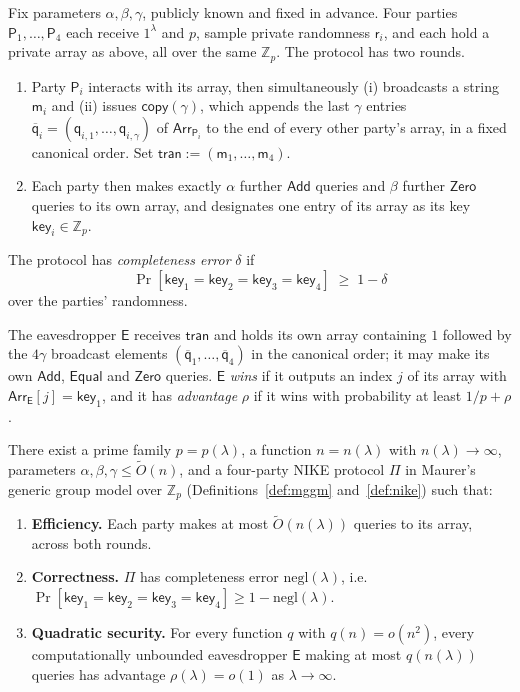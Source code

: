 \documentclass{aicr-conjecture}
\newcommand{\Zp}{\mathbb{Z}_{p}}
\newcommand{\Add}{\mathsf{Add}}
\newcommand{\Zero}{\mathsf{Zero}}
\newcommand{\Equal}{\mathsf{Equal}}
\newcommand{\copyq}{\mathsf{copy}}
\newcommand{\Arr}{\mathsf{Arr}}
\newcommand{\Pty}{\mathsf{P}}
\newcommand{\Ev}{\mathsf{E}}
\newcommand{\tran}{\mathsf{tran}}
\newcommand{\keyv}{\mathsf{key}}
\newcommand{\rv}{\mathsf{r}}
\newcommand{\mv}{\mathsf{m}}
\newcommand{\qv}{\mathsf{q}}
\newcommand{\negl}{\mathrm{negl}}
\begin{document}
\begin{definition}\label{def:nike}
Fix parameters $\alpha, \beta, \gamma$, publicly known and fixed in
advance. Four parties $\Pty_{1},\dots,\Pty_{4}$ each receive $1^{\lambda}$
and $p$, sample private randomness $\rv_{i}$, and each hold a private
array as above, all over the same $\Zp$. The protocol has two rounds.
\begin{enumerate}
  \item Party $\Pty_{i}$ interacts with its array, then simultaneously
    (i) broadcasts a string $\mv_{i}$ and (ii) issues $\copyq(\gamma)$,
    which appends the last $\gamma$ entries
    $\overline{\qv}_{i} = (\qv_{i,1},\dots,\qv_{i,\gamma})$ of
    $\Arr_{\Pty_{i}}$ to the end of every other party's array, in a fixed
    canonical order. Set $\tran := (\mv_{1},\dots,\mv_{4})$.
  \item Each party then makes exactly $\alpha$ further $\Add$ queries and
    $\beta$ further $\Zero$ queries to its own array, and designates one
    entry of its array as its key $\keyv_{i} \in \Zp$.
\end{enumerate}
The protocol has \emph{completeness error} $\delta$ if
\[
  \Pr[\keyv_{1} = \keyv_{2} = \keyv_{3} = \keyv_{4}] \;\ge\; 1 - \delta
\]
over the parties' randomness.

The eavesdropper $\Ev$ receives $\tran$ and holds its own array
containing $1$ followed by the $4\gamma$ broadcast elements
$(\overline{\qv}_{1},\dots,\overline{\qv}_{4})$ in the canonical order;
it may make its own $\Add$, $\Equal$ and $\Zero$ queries. $\Ev$
\emph{wins} if it outputs an index $j$ of its array with
$\Arr_{\Ev}[j] = \keyv_{1}$, and it has \emph{advantage} $\rho$ if it
wins with probability at least $1/p + \rho$.
\end{definition}

\begin{conjecture}\label{conj:main}
There exist a prime family $p = p(\lambda)$, a function $n = n(\lambda)$
with $n(\lambda) \to \infty$, parameters
$\alpha, \beta, \gamma \le \tilde{O}(n)$, and a four-party NIKE protocol
$\Pi$ in Maurer's generic group model over $\Zp$
(Definitions~\ref{def:mggm} and~\ref{def:nike}) such that:
\begin{enumerate}
  \item \textbf{Efficiency.} Each party makes at most
    $\tilde{O}(n(\lambda))$ queries to its array, across both rounds.
  \item \textbf{Correctness.} $\Pi$ has completeness error
    $\negl(\lambda)$, i.e.
    $\Pr[\keyv_{1} = \keyv_{2} = \keyv_{3} = \keyv_{4}]
    \ge 1 - \negl(\lambda)$.
  \item \textbf{Quadratic security.} For every function $q$ with
    $q(n) = o(n^{2})$, every computationally unbounded eavesdropper
    $\Ev$ making at most $q(n(\lambda))$ queries has advantage
    $\rho(\lambda) = o(1)$ as $\lambda \to \infty$.
\end{enumerate}
\end{conjecture}
\end{document}
